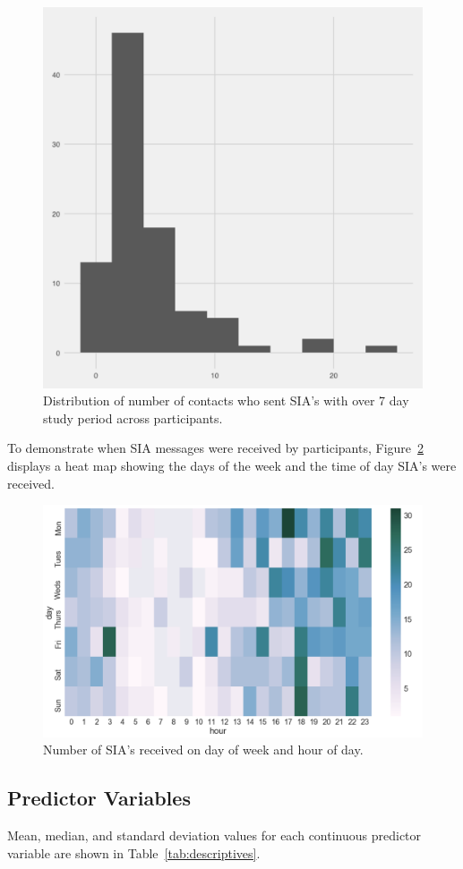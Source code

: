 \documentclass[12pt]{nuthesis}	%
\begin{document}
\begin{figure}[h]
\centering
\includegraphics[width=.7\textwidth]{figures/sia_messages_contacts_distribution}
\caption{Distribution of number of contacts who sent SIA's with over 7 day study period across participants.}
\label{fig:sia_num_contacts}
\end{figure}

To demonstrate when SIA messages were received by participants, Figure~\ref{fig:sia_heatmap} displays a heat map showing the days of the week and the time of day SIA's were received.

\begin{figure}[h]
\centering
\includegraphics[width=.7\textwidth]{figures/sia_heatmap}
\caption{Number of SIA's received on day of week and hour of day.}
\label{fig:sia_heatmap}
\end{figure}

\subsection{Predictor Variables}

Mean, median, and standard deviation values for each continuous predictor variable are shown in Table~\ref{tab:descriptives}.
\end{document}
